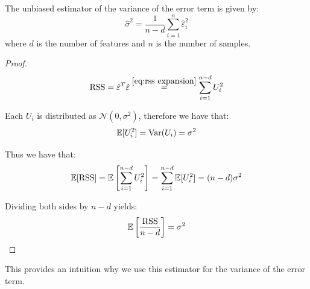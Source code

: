 \begin{theorem} \label{thm:variance estimator}
    The unbiased estimator of the variance of the error term is given by:
    \[\hat{\sigma}^2 = \frac{1}{n - d} \sum_{i=1}^{n} \hat{\varepsilon}_i^2\]
    where $d$ is the number of features and $n$ is the number of samples.    
\end{theorem}
\begin{proof}                                                             
    \[\text{RSS} 
        = \hat{\varepsilon}^T\hat{\varepsilon}
        \overset{\eqref{eq:rss expansion}}{=} \sum_{i=1}^{n - d} U_i^2\]
    
    Each $U_i$ is distributed as $\mathcal{N}(0, \sigma^2)$, therefore we have that:
    \[\operatorname{\mathbb{E}}[U_i^2] = \operatorname{Var}(U_i) = \sigma^2\]
    
    Thus we have that:
    \[\operatorname{\mathbb{E}}[\text{RSS}] = \operatorname{\mathbb{E}}\left[\sum_{i=1}^{n - d} U_i^2\right] = \sum_{i=1}^{n - d} \operatorname{\mathbb{E}}[U_i^2] = (n - d) \sigma^2\]
    
    Dividing both sides by $n - d$ yields:
    \[\operatorname{\mathbb{E}}\left[\frac{\text{RSS}}{n - d}\right] = \sigma^2\]
\end{proof}
\begin{remark}                                                
    This provides an intuition why we use this estimator for the variance of the error term.
\end{remark}


